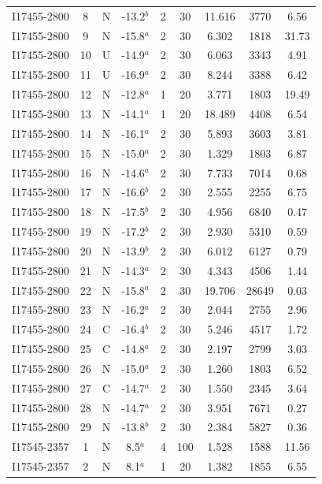 \begin{table}
\begin{tabular}{ccccccccc}
I17455-2800 & 8 & N & -13.2$^{b}$ & 2 & 30 & 11.616 & 3770 & 6.56 \\
I17455-2800 & 9 & N & -15.8$^{a}$ & 2 & 30 & 6.302 & 1818 & 31.73 \\
I17455-2800 & 10 & U & -14.9$^{a}$ & 2 & 30 & 6.063 & 3343 & 4.91 \\
I17455-2800 & 11 & U & -16.9$^{a}$ & 2 & 30 & 8.244 & 3388 & 6.42 \\
I17455-2800 & 12 & N & -12.8$^{a}$ & 1 & 20 & 3.771 & 1803 & 19.49 \\
I17455-2800 & 13 & N & -14.1$^{a}$ & 1 & 20 & 18.489 & 4408 & 6.54 \\
I17455-2800 & 14 & N & -16.1$^{a}$ & 2 & 30 & 5.893 & 3603 & 3.81 \\
I17455-2800 & 15 & N & -15.0$^{a}$ & 2 & 30 & 1.329 & 1803 & 6.87 \\
I17455-2800 & 16 & N & -14.6$^{a}$ & 2 & 30 & 7.733 & 7014 & 0.68 \\
I17455-2800 & 17 & N & -16.6$^{b}$ & 2 & 30 & 2.555 & 2255 & 6.75 \\
I17455-2800 & 18 & N & -17.5$^{b}$ & 2 & 30 & 4.956 & 6840 & 0.47 \\
I17455-2800 & 19 & N & -17.2$^{b}$ & 2 & 30 & 2.930 & 5310 & 0.59 \\
I17455-2800 & 20 & N & -13.9$^{b}$ & 2 & 30 & 6.012 & 6127 & 0.79 \\
I17455-2800 & 21 & N & -14.3$^{a}$ & 2 & 30 & 4.343 & 4506 & 1.44 \\
I17455-2800 & 22 & N & -15.8$^{a}$ & 2 & 30 & 19.706 & 28649 & 0.03 \\
I17455-2800 & 23 & N & -16.2$^{a}$ & 2 & 30 & 2.044 & 2755 & 2.96 \\
I17455-2800 & 24 & C & -16.4$^{b}$ & 2 & 30 & 5.246 & 4517 & 1.72 \\
I17455-2800 & 25 & C & -14.8$^{a}$ & 2 & 30 & 2.197 & 2799 & 3.03 \\
I17455-2800 & 26 & N & -15.0$^{a}$ & 2 & 30 & 1.260 & 1803 & 6.52 \\
I17455-2800 & 27 & C & -14.7$^{a}$ & 2 & 30 & 1.550 & 2345 & 3.64 \\
I17455-2800 & 28 & N & -14.7$^{a}$ & 2 & 30 & 3.951 & 7671 & 0.27 \\
I17455-2800 & 29 & N & -13.8$^{b}$ & 2 & 30 & 2.384 & 5827 & 0.36 \\
I17545-2357 & 1 & N & 8.5$^{a}$ & 4 & 100 & 1.528 & 1588 & 11.56 \\
I17545-2357 & 2 & N & 8.1$^{a}$ & 1 & 20 & 1.382 & 1855 & 6.55 \\

\end{tabular}
\end{table}
